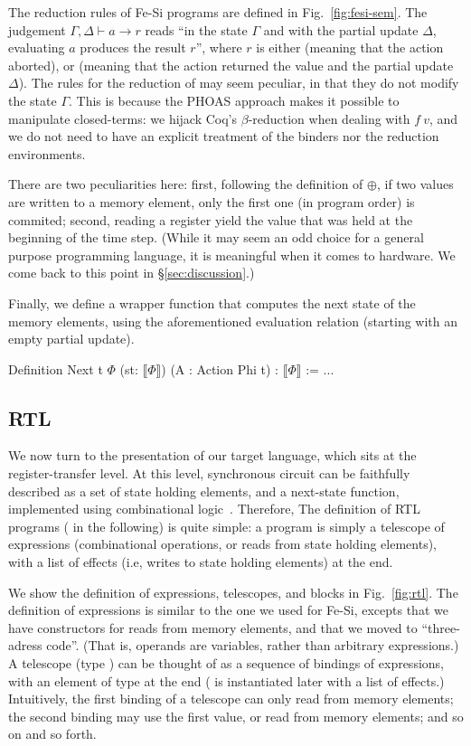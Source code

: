 \documentclass[preprint]{sigplanconf}
\newcommand{\denote}[1]{\llbracket #1 \rrbracket}
\begin{document}
The reduction rules of Fe-Si programs are defined in
Fig.~\ref{fig:fesi-sem}. The judgement $\Gamma, \Delta \vdash a \to r$
reads ``in the state $\Gamma$ and with the partial update $\Delta$,
evaluating $a$ produces the result $r$'', where $r$ is either
 (meaning that the action aborted), or %
 (meaning that the action returned the value
 and the partial update $\Delta$). 
%
The rules for the reduction of  may seem peculiar, in that
they do not modify the state $\Gamma$. 
%
This is because the PHOAS approach makes it possible to manipulate
closed-terms: we hijack Coq's $\beta$-reduction when dealing with
$f~v$, and we do not need to have an explicit treatment of the binders
nor the reduction environments.

There are two peculiarities here: first, following the definition of
$\oplus$, if two values are written to a memory element, only the
first one (in program order) is commited; second, reading a register
yield the value that was held at the beginning of the time step. 
%
(While it may seem an odd choice for a general purpose programming
language, it is meaningful when it comes to hardware. We come back to
this point in \S\ref{sec:discussion}.)

Finally, we define a wrapper function that computes the next state of
the memory elements, using the aforementioned evaluation relation
(starting with an empty partial update). 
\begin{coq}
Definition Next {t} $\Phi$ (st: $\denote{\Phi}$) (A : Action Phi t) : $\denote{\Phi}$ := ...
\end{coq}

\subsection{RTL} 
We now turn to the presentation of our target language, which sits at
the register-transfer level. At this level, synchronous circuit can be
faithfully described as a set of state holding elements, and a
next-state function, implemented using combinational
logic~\cite{DBLP:journals/cj/Gordon02}.
%
Therefore, The definition of RTL programs ( in the
following) is quite simple: a program is simply a telescope of
expressions (combinational operations, or reads from state holding
elements), with a list of effects (i.e, writes to state holding
elements) at the end. 

We show the definition of expressions, telescopes, and blocks in
Fig.~\ref{fig:rtl}. 
%
The definition of expressions is similar to the one we used for Fe-Si,
excepts that we have constructors for reads from memory elements, and
that we moved to ``three-adress code''.
%
(That is, operands are variables, rather than arbitrary expressions.)
%
A telescope (type ) can be thought of as a sequence of
bindings of expressions, with an element of type  at the
end ( is instantiated later with a list of effects.)
%
Intuitively, the first binding of a telescope can only read from
memory elements; the second binding may use the first value, or read
from memory elements; and so on and so forth.
\end{document}
